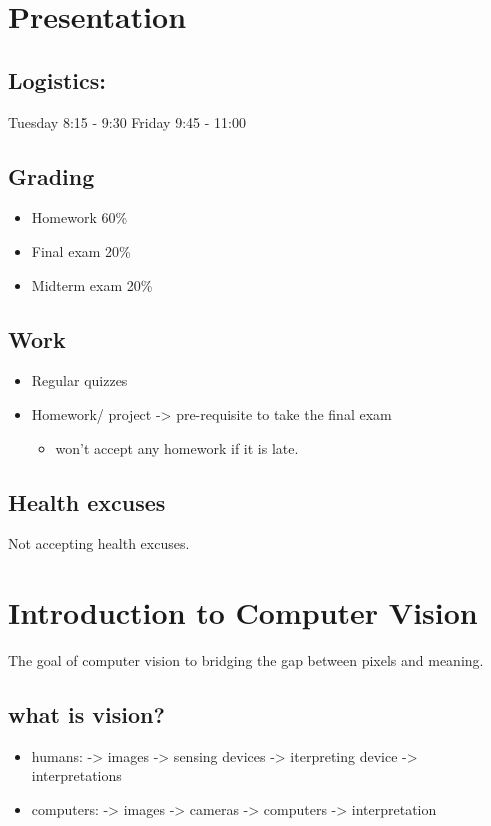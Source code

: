 \documentclass[11pt]{article}
\author{Yiping Deng}
\date{\today}
\title{}
\begin{document}
\tableofcontents

\section{Presentation}
\label{sec:orgc2cf30a}
\subsection{Logistics:}
\label{sec:org388231e}
Tuesday 8:15 - 9:30
Friday 9:45 - 11:00
\subsection{Grading}
\label{sec:orgb47f9f5}
\begin{itemize}
\item Homework 60\%
\item Final exam 20\%
\item Midterm exam 20\%
\end{itemize}
\subsection{Work}
\label{sec:orgc901e62}
\begin{itemize}
\item Regular quizzes
\item Homework/ project -> pre-requisite to take the final exam
\begin{itemize}
\item won't accept any homework if it is late.
\end{itemize}
\end{itemize}
\subsection{Health excuses}
\label{sec:org0962223}
Not accepting health excuses.
\section{Introduction to Computer Vision}
\label{sec:org79c842d}
The goal of computer vision to bridging the gap between pixels and meaning.
\subsection{what is vision?}
\label{sec:org6774e00}
\begin{itemize}
\item humans: -> images -> sensing devices -> iterpreting device -> interpretations
\item computers: -> images -> cameras -> computers -> interpretation
\end{itemize}
\end{document}
